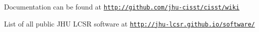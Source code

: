 Documentation can be found at \href{http://github.com/jhu-cisst/cisst/wiki}{\tt http\-://github.\-com/jhu-\/cisst/cisst/wiki}

List of all public J\-H\-U L\-C\-S\-R software at \href{http://jhu-lcsr.github.io/software/}{\tt http\-://jhu-\/lcsr.\-github.\-io/software/} 